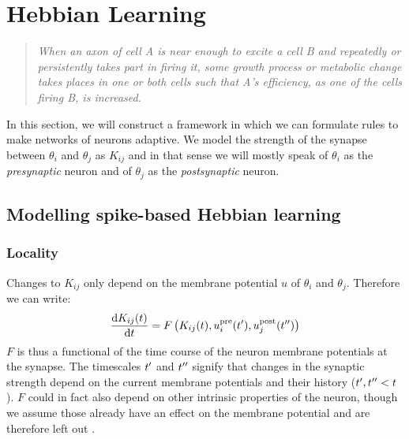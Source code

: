 


\mainmatter

\section{Hebbian Learning}
\vspace{1mm}
\begin{quote}
\textsl{When an axon of cell A is near enough to excite a cell B and repeatedly or persistently takes part in firing it, some growth process or metabolic change takes places in one or both cells such that A's efficiency, as one of the cells firing B, is increased.}\cite{Hebb1949}
\end{quote}


In this section, we will construct a framework in which we can formulate rules to make networks of neurons adaptive. We model the strength of the synapse between $\theta_i$ and $\theta_j$ as $K_{ij}$ and in that sense we will mostly speak of $\theta_i$ as the \textsl{presynaptic} neuron and of $\theta_j$ as the \textsl{postsynaptic} neuron.

\subsection{Modelling spike-based Hebbian learning}
\subsubsection{Locality}
Changes to $K_{ij}$ only depend on the membrane potential $u$ of $\theta_i$ and $\theta_j$. Therefore we can write:
\begin{align}
\frac{\mathrm{d}K_{i j}(t) }{\mathrm{d} t} = F \left( K_{i j}(t) , u_{i}^{\rm pre} ({t^{\prime}}), u_{j}^{\rm post} ({t^{\prime \prime}})\right) \label{eq:localityfunctional}
\end{align}
$F$ is thus a functional of the time course of the neuron membrane potentials at the synapse. The timescales ${t^{\prime}}$ and ${t^{\prime \prime}}$ signify that changes in the synaptic strength depend on the current membrane potentials and their history (${t^{\prime}}, {t^{\prime \prime}} < t$). $F$ could in fact also depend on other intrinsic properties of the neuron, though we assume those already have an effect on the membrane potential and are therefore left out \cite{Gerstner2002}.

